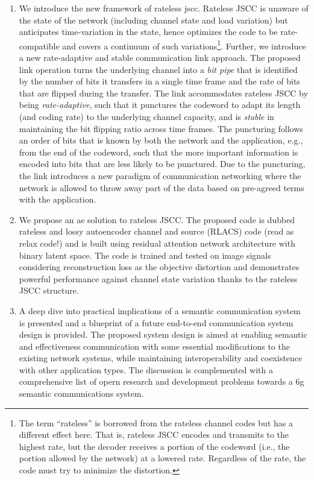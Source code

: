\begin{enumerate}
    \item We introduce the new framework of  rateless \gls{jscc}. Rateless JSCC is unaware of the state of the network (including channel state and load variation) but anticipates  time-variation in the state, hence optimizes the code to be rate-compatible and covers a continuum of such variations\footnote{The term ``rateless'' is  borrowed from the rateless channel codes \cite{6145513} but has a different  effect here. That is, rateless JSCC encodes and transmits to the highest  rate, but the decoder receives  a portion of the codeword (i.e., the portion allowed by the network) at a lowered rate. Regardless of the rate, the code must try to minimize the distortion.}. Further, we introduce a new rate-adaptive and stable communication link approach. The proposed link operation turns the underlying channel into a \emph{bit pipe} that is identified by the number of bits it transfers in a single time frame and the rate of bits that are flipped during the transfer. The link accommodates rateless JSCC by being \emph{rate-adaptive}, such that it punctures the codeword  to adapt its length (and coding rate) to the underlying channel capacity, and is  \emph{stable} in maintaining the bit flipping ratio across time frames. The puncturing follows an order of bits that is known by both the network and the application, e.g., from the end of the codeword, such that the more important information is encoded into bits that are less likely to be punctured. Due to the puncturing, the link introduces a new paradigm of communication networking where the network is allowed to throw away part of the data based on pre-agreed terms with the application. 
    \item We propose an \gls{ae}  solution to  rateless JSCC. The proposed code is dubbed rateless and lossy autoencoder channel and source (RLACS) code (read as relax code!) and is built using residual attention network architecture \cite{wang2017residual} with binary latent space. The code is trained and tested on image signals considering reconstruction loss as the objective distortion and demonstrates powerful performance against channel state variation thanks to the rateless JSCC structure.
    \item A deep dive into practical implications of a semantic communication system is presented and a blueprint of a future end-to-end communication system design is provided. The proposed system design is aimed at enabling semantic and effectiveness communication with some essential modifications to the existing network systems, while maintaining interoperability and coexistence with other application types. The discussion is complemented with a comprehensive list of opern research and development problems towards a \gls{6g} semantic communications system.
\end{enumerate}

